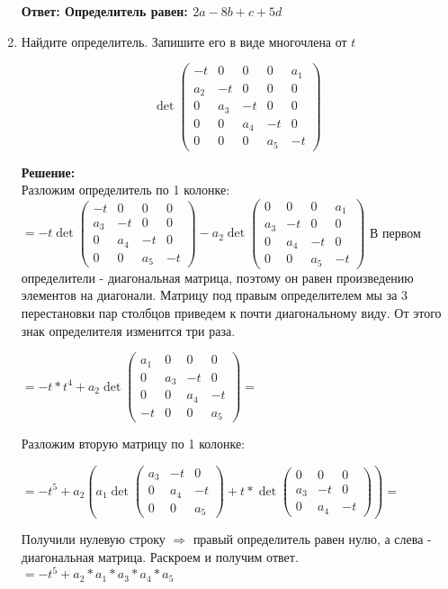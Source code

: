 \documentclass[a4paper,12pt]{article}
\begin{document}
\begin{enumerate}
\textbf{Ответ: Определитель равен: $2a-8b+c+5d$}
\item Найдите определитель. Запишите его в виде многочлена от $t$

$$
\det\begin{pmatrix}
-t&0&0&0&a_1\\
a_2&-t&0&0&0\\
0&a_3&-t&0&0\\
0&0&a_4&-t&0\\
0&0&0&a_5&-t
\end{pmatrix}
$$

\vspace{5pt}
\textbf{Решение:}\\
Разложим определитель по 1 колонке:
$=-t \det \begin{pmatrix}
-t&0&0&0\\
a_3&-t&0&0\\
0&a_4&-t&0\\
0&0&a_5&-t
\end{pmatrix} - a_2 \det \begin{pmatrix}
0&0&0&a_1\\
a_3&-t&0&0\\
0&a_4&-t&0\\
0&0&a_5&-t
\end{pmatrix}$ 
В первом определители - диагональная матрица, поэтому он равен произведению элементов на диагонали. Матрицу под правым определителем мы за 3 перестановки пар столбцов приведем к почти диагональному виду. От этого знак определителя изменится три раза.

$=-t*t^4 + a_2 \det \begin{pmatrix}
a_1&0&0&0\\
0&a_3&-t&0\\
0&0&a_4&-t\\
-t&0&0&a_5
\end{pmatrix}=$

Разложим вторую матрицу по 1 колонке:

$=-t^5+a_2(a_1 \det \begin{pmatrix}
a_3&-t&0\\
0&a_4&-t\\
0&0&a_5
\end{pmatrix} +t * \det \begin{pmatrix}
0&0&0\\
a_3&-t&0\\
0&a_4&-t
\end{pmatrix})=$ 

Получили нулевую строку $\Rightarrow$ правый определитель равен нулю, а слева - диагональная матрица.
Раскроем и получим ответ.
$=-t^5+a_2*a_1*a_3*a_4*a_5$



\end{enumerate}
\end{document}
